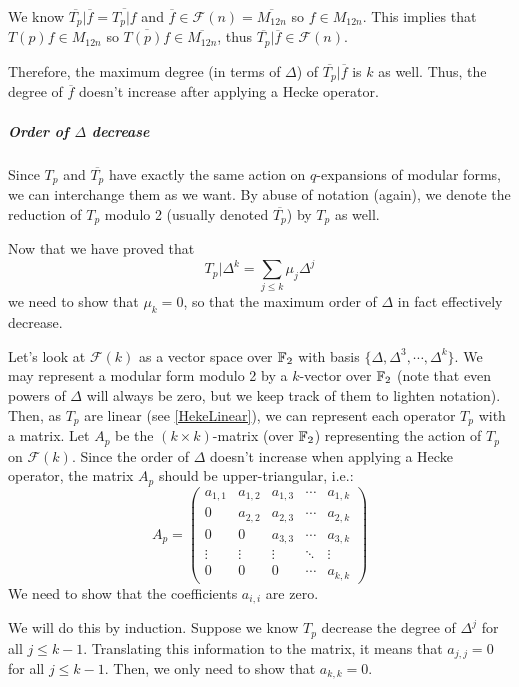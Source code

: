We know $\overline{T_p}|\overline{f} = \overline{T_p|f}$ and $\overline{f} \in \mathcal{F}(n) = \overline{M_{12n}}$ so $f \in M_{12n}$.
This implies that $T(p)f \in M_{12n}$ so $\overline{T(p)f} \in \overline{M_{12n}}$, thus $\overline{T_p}|\overline{f} \in \mathcal{F}(n)$.

Therefore, the maximum degree (in terms of $\Delta$) of $\overline{T_p}|\overline{f}$ is $k$ as well.
Thus, the degree of $\overline{f}$ doesn't increase after applying a Hecke operator.

\subparagraph{Order of $\Delta$ decrease}
\label{orderDecrease}
Since $T_p$ and $\overline{T_p}$ have exactly the same action on $q$-expansions of modular forms, we can interchange them as we want.
By abuse of notation (again), we denote the reduction of $T_p$ modulo 2 (usually denoted $\overline{T_p}$) by $T_p$ as well.

Now that we have proved that 
$$
T_p| \Delta^k = \sum_{j \leq k} \mu_j \Delta^j
$$
we need to show that $\mu_k = 0$, so that the maximum order of $\Delta$ in fact effectively decrease.

Let's look at $\mathcal{F}(k)$ as a vector space over $\mathbb{F}_2$ with basis $\{ \Delta, \Delta^3, \cdots, \Delta^k \}$.
We may represent a modular form modulo 2 by a $k$-vector over $\mathbb{F}_2$ (note that even powers of $\Delta$ will always be zero, but we keep track of them to lighten notation).
Then, as $T_p$ are linear (see \ref{HekeLinear}), we can represent each operator $T_p$ with a matrix.
Let $A_p$ be the $(k \times k)$-matrix (over $\mathbb{F}_2$) representing the action of $T_p$ on $\mathcal{F}(k)$.
Since the order of $\Delta$ doesn't increase when applying a Hecke operator, the matrix $A_p$ should be upper-triangular, i.e.:
$$
A_p = 
\begin{pmatrix}
a_{1,1} & a_{1,2} & a_{1,3} & \cdots & a_{1,k} \\
   0    & a_{2,2} & a_{2,3} & \cdots & a_{2,k} \\
   0    &    0    & a_{3,3} & \cdots & a_{3,k} \\
\vdots  & \vdots  & \vdots  & \ddots & \vdots  \\
   0    &    0    &    0    & \cdots & a_{k,k}
\end{pmatrix}
$$
We need to show that the coefficients $a_{i,i}$ are zero.

We will do this by induction.
Suppose we know $T_p$ decrease the degree of $\Delta^j$ for all $j \leq k-1$.
Translating this information to the matrix, it means that $a_{j,j}=0$ for all $j \leq k-1$.
Then, we only need to show that $a_{k,k}=0$.

